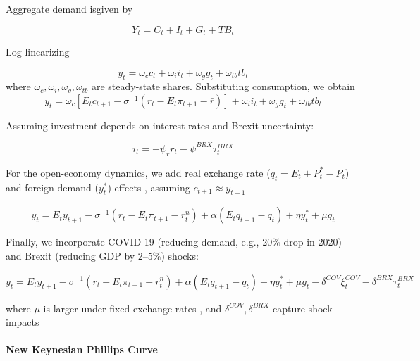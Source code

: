 \documentclass[
]{article}
\begin{document}
Aggregate demand isgiven by 

\begin{equation*}
Y_t = C_t + I_t + G_t + TB_t
\end{equation*}

Log-linearizing 

\begin{equation*}
y_t = \omega_c c_t + \omega_i i_t + \omega_g g_t + \omega_{tb} tb_t
\end{equation*}
where \( \omega_c, \omega_i, \omega_g, \omega_{tb} \) are steady-state shares. Substituting consumption, we obtain
\begin{equation*}
y_t = \omega_c \left[ E_t c_{t+1} - \sigma^{-1} (r_t - E_t \pi_{t+1} - \bar{r}) \right] + \omega_i i_t + \omega_g g_t + \omega_{tb} tb_t
\end{equation*}

Assuming investment depends on interest rates and Brexit uncertainty:

\begin{equation*}
i_t = -\psi_r r_t - \psi^{BRX} \tau_t^{BRX}
\end{equation*}

For the open-economy dynamics, we add real exchange rate (\( q_t = E_t + P_t^* - P_t \)) and foreign demand (\( y_t^* \)) effects %
, assuming \( c_{t+1} \approx y_{t+1} \)

\begin{equation*}
y_t = E_t y_{t+1} - \sigma^{-1} (r_t - E_t \pi_{t+1} - r_t^n) + \alpha (E_t q_{t+1} - q_t) + \eta y_t^* + \mu g_t
\end{equation*}

Finally, we incorporate COVID-19 (reducing demand, e.g., 20\% drop in 2020) and Brexit (reducing GDP by 2--5\%) shocks:

\begin{equation}
y_t = E_t y_{t+1} - \sigma^{-1} (r_t - E_t \pi_{t+1} - r_t^n) + \alpha (E_t q_{t+1} - q_t) + \eta y_t^* + \mu g_t - \delta^{COV} \xi_t^{COV} - \delta^{BRX} \tau_t^{BRX}
\label{eq:is}
\end{equation}

where \( \mu \) is larger under fixed exchange rates %
, and \( \delta^{COV}, \delta^{BRX} \) capture shock impacts%

\paragraph*{New Keynesian Phillips Curve}
\end{document}
